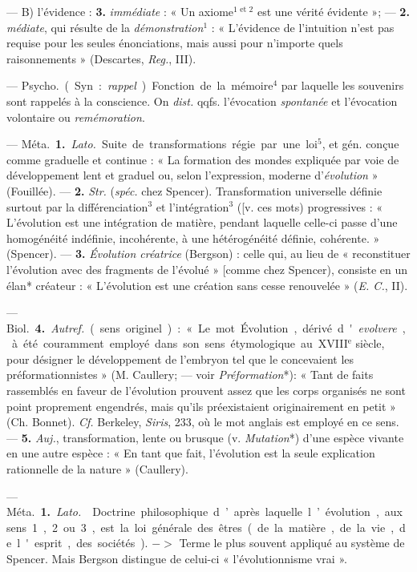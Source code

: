 \begin{itemize}[leftmargin=1cm, label=, itemsep=1pt]
— B) l'évidence : {\bf 3.} {\it immédiate} : « Un axiome$^\text{1 et 2}$
est une vérité évidente »; — {\bf 2.} {\it médiate}, qui résulte de
la {\it démonstration}$^1$ : « L'évidence de
l'intuition n’est pas requise pour les
seules énonciations, mais aussi pour
n'importe quels raisonnements »
(Descartes, {\it Reg.}, III).

 — \si{Psycho.} (Syn. : {\it rappel}).
Fonction de la mémoire$^4$ par laquelle
les souvenirs sont rappelés à la conscience. On {\it dist.} qqfs. l'évocation
{\it spontanée} et l’évocation volontaire
ou {\it remémoration}.

 — \si{Méta.} {\bf 1.} {\it Lato.} Suite de
transformations régie par une loi$^5$,
et gén. conçue comme graduelle et
continue : « La formation des mondes
expliquée par voie de développement lent et graduel ou, selon
l'expression, moderne d'{\it évolution} »
(Fouillée). — {\bf 2.} {\it Str.} ({\it spéc.} chez
Spencer). Transformation universelle définie surtout par la différenciation$^3$ et l'intégration$^3$ ([v. ces
mots) progressives : « L’évolution
est une intégration de matière, pendant laquelle celle-ci passe d’une
homogénéité indéfinie, incohérente,
à une hétérogénéité définie, cohérente. » (Spencer). — {\bf 3.}
{\it Évolution créatrice} (Bergson) : celle qui, au
lieu de « reconstituer l’évolution
avec des fragments de l’évolué »
[comme chez Spencer), consiste en
un élan* créateur : « L'évolution
est une création sans cesse renouvelée » ({\it E. C.}, II).

— \si{Biol.} {\bf 4.} {\it Autref.} (sens originel) :
« Le mot Évolution, dérivé d'{\it evolvere}, à été couramment employé
dans son sens étymologique au {\footnotesize XVIII}$^\text{e}$ siècle,
pour désigner le développement de l'embryon tel que le
concevaient les préformationnistes »
(M. Caullery; — voir {\it Préformation}*):
« Tant de faits rassemblés en faveur
de l’évolution prouvent assez que
les corps organisés ne sont point
proprement engendrés, mais qu'ils
préexistaient originairement en
petit » (Ch. Bonnet). {\it Cf.} Berkeley,
{\it Siris}, 233, où le mot anglais est
employé en ce sens. — {\bf 5.} {\it Auj.}, transformation, lente ou brusque (v. {\it Mutation}*) d’une espèce vivante en une
autre espèce : « En tant que fait,
l’évolution est la seule explication
rationnelle de la nature » (Caullery).

 — \si{Méta.}
{\bf 1.} {\it Lato.}  Doctrine philosophique
d’après laquelle l’évolution, aux sens 1, 2 ou 3, est la loi
générale des êtres (de la matière,
de la vie, de l'esprit, des sociétés).
$->$ Terme le plus souvent appliqué
au système de Spencer. Mais Bergson
distingue de celui-ci « l’évolutionnisme vrai ».


\end{itemize}
